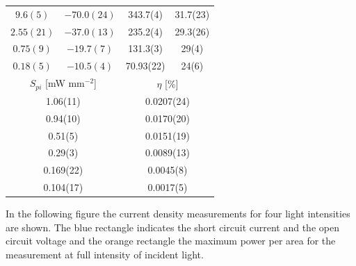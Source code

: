 \documentclass[a4paper,10pt,twocolumn]{article}
\begin{document}
\begin{extract*}
\begin{table}[h]
\begin{tabular}{@{}cccc@{}}
		\multicolumn{1}{c}{$ 9.6(5) $}                    & $ -70.0(24) $                         & \multicolumn{1}{c}{343.7(4)}    & 31.7(23)  \\
		\multicolumn{1}{c}{$ 2.55(21) $}                  & $ -37.0(13) $                         & \multicolumn{1}{c}{235.2(4)}    & 29.3(26)  \\
		\multicolumn{1}{c}{$ 0.75(9) $}                   & $ -19.7(7) $                          & \multicolumn{1}{c}{131.3(3)}    & 29(4)     \\
		\multicolumn{1}{c}{$ 0.18(5) $}                   & $ -10.5(4) $                          & \multicolumn{1}{c}{70.93(22)}   & 24(6)     \\ \midrule
		\multicolumn{2}{c}{$S_{pi}$ [mW mm$^{-2}$]}                                               & \multicolumn{2}{c}{$\eta$ [\%]}             \\\midrule
		\multicolumn{2}{c}{1.06(11)}                                                              & \multicolumn{2}{c}{0.0207(24)}              \\
		\multicolumn{2}{c}{0.94(10)}                                                              & \multicolumn{2}{c}{0.0170(20)}              \\
		\multicolumn{2}{c}{0.51(5)}                                                               & \multicolumn{2}{c}{0.0151(19)}              \\
		\multicolumn{2}{c}{0.29(3)}                                                               & \multicolumn{2}{c}{0.0089(13)}              \\
		\multicolumn{2}{c}{0.169(22)}                                                             & \multicolumn{2}{c}{0.0045(8)}               \\
		\multicolumn{2}{c}{0.104(17)}                                                             & \multicolumn{2}{c}{0.0017(5)}               \\ \bottomrule
	\end{tabular}
\end{table}


In the following figure the current density measurements for four light intensities are shown. The blue rectangle indicates the short circuit current and the open circuit voltage and the orange rectangle the maximum power per area for the measurement at full intensity of incident light.


\end{extract*}
\end{document}
